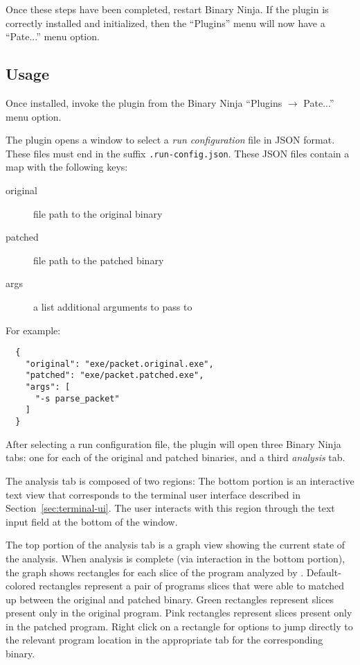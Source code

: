 Once these steps have been completed, restart Binary Ninja.
If the plugin is correctly installed and initialized, then the ``Plugins'' menu will now have a ``Pate...'' menu option.

\subsection{Usage}

Once installed, invoke the \pate{} plugin from the Binary Ninja ``Plugins $\rightarrow$ Pate...'' menu option.

The \pate{} plugin opens a window to select a \emph{run configuration} file in JSON format.
These files must end in the suffix \texttt{.run-config.json}.
These JSON files contain a map with the following keys:
\begin{description}
    \item[original] file path to the original binary
    \item[patched] file path to the patched binary
    \item[args] a list additional arguments to pass to \pate{}
\end{description}

For example:

\begin{verbatim}
  {
    "original": "exe/packet.original.exe",
    "patched": "exe/packet.patched.exe",
    "args": [
      "-s parse_packet"
    ]
  }
\end{verbatim}

After selecting a run configuration file, the \pate{} plugin will open three Binary Ninja tabs: one for each of the original and patched binaries, and a third \emph{\pate{} analysis} tab.

The \pate{} analysis tab is composed of two regions:
The bottom portion is an interactive text view that corresponds to the terminal user interface described in Section~\ref{sec:terminal-ui}.
The user interacts with this region through the text input field at the bottom of the window.

The top portion of the \pate{} analysis tab is a graph view showing the current state of the \pate{} analysis.
When \pate{} analysis is complete (via interaction in the bottom portion), the \pate{} graph shows rectangles for each slice of the program analyzed by \pate{}.
Default-colored rectangles represent a pair of programs slices that were able to matched up between the original and patched binary.
Green rectangles represent slices present only in the original program.
Pink rectangles represent slices present only in the patched program.
Right click on a rectangle for options to jump directly to the relevant program location in the appropriate tab for the corresponding binary.

